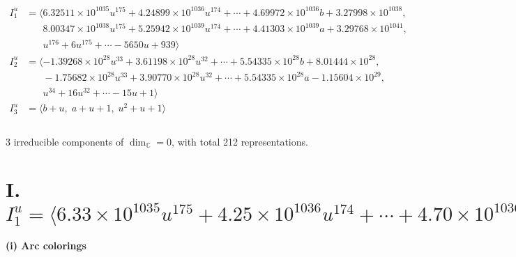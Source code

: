 \documentclass[1p]{elsarticle_modified}
\theoremstyle{definition}
\begin{document}
\begin{align*}
I^u_{1}&=\langle 
6.32511\times10^{1035} u^{175}+4.24899\times10^{1036} u^{174}+\cdots+4.69972\times10^{1036} b+3.27998\times10^{1038},\\
\phantom{I^u_{1}}&\phantom{= \langle  }8.00347\times10^{1038} u^{175}+5.25942\times10^{1039} u^{174}+\cdots+4.41303\times10^{1039} a+3.29768\times10^{1041},\\
\phantom{I^u_{1}}&\phantom{= \langle  }u^{176}+6 u^{175}+\cdots-5650 u+939\rangle \\
I^u_{2}&=\langle 
-1.39268\times10^{28} u^{33}+3.61198\times10^{28} u^{32}+\cdots+5.54335\times10^{28} b+8.01444\times10^{28},\\
\phantom{I^u_{2}}&\phantom{= \langle  }-1.75682\times10^{28} u^{33}+3.90770\times10^{28} u^{32}+\cdots+5.54335\times10^{28} a-1.15604\times10^{29},\\
\phantom{I^u_{2}}&\phantom{= \langle  }u^{34}+16 u^{32}+\cdots-15 u+1\rangle \\
I^u_{3}&=\langle 
b+u,\;a+u+1,\;u^2+u+1\rangle \\
\\
\end{align*}
\raggedright * 3 irreducible components of $\dim_{\mathbb{C}}=0$, with total 212 representations.\\
\newpage
\renewcommand{\arraystretch}{1}
\centering \section*{I. $I^u_{1}= \langle 6.33\times10^{1035} u^{175}+4.25\times10^{1036} u^{174}+\cdots+4.70\times10^{1036} b+3.28\times10^{1038},\;8.00\times10^{1038} u^{175}+5.26\times10^{1039} u^{174}+\cdots+4.41\times10^{1039} a+3.30\times10^{1041},\;u^{176}+6 u^{175}+\cdots-5650 u+939 \rangle$}
\flushleft \textbf{(i) Arc colorings}\\
\end{document}
